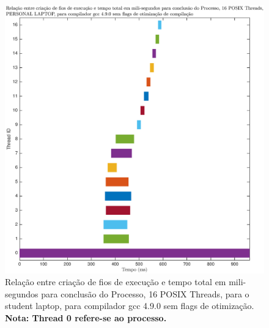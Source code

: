 \documentclass[conference,compsoc]{IEEEtran}
\begin{document}
\begin{figure}[H]
\centering
\includegraphics[width=1.1\columnwidth]{EPS/time_create_16T.eps}
\caption{Relação entre criação de fios de execução e tempo total em mili-segundos para conclusão do Processo, 16 POSIX Threads, para o student laptop, para compilador gcc 4.9.0 sem flags de otimização. \textbf{Nota: Thread 0 refere-se ao processo.}}
\label{fig:create_16}
\end{figure}
\end{document}
